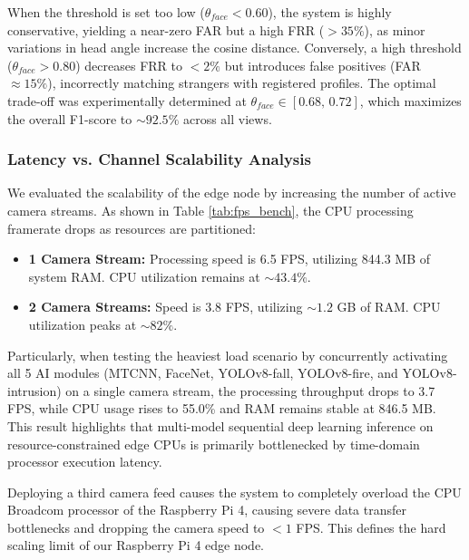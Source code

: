 \documentclass[12pt,a4paper]{article}
\begin{document}
When the threshold is set too low ($\theta_{face} < 0.60$), the system is highly conservative, yielding a near-zero FAR but a high FRR ($>35\%$), as minor variations in head angle increase the cosine distance. Conversely, a high threshold ($\theta_{face} > 0.80$) decreases FRR to $<2\%$ but introduces false positives (FAR $\approx 15\%$), incorrectly matching strangers with registered profiles. The optimal trade-off was experimentally determined at $\theta_{face} \in [0.68,\, 0.72]$, which maximizes the overall F1-score to $\sim 92.5\%$ across all views.

\subsubsection*{Latency vs. Channel Scalability Analysis}
We evaluated the scalability of the edge node by increasing the number of active camera streams. As shown in Table \ref{tab:fps_bench}, the CPU processing framerate drops as resources are partitioned:
\begin{itemize}
    \item \textbf{1 Camera Stream:} Processing speed is 6.5 FPS, utilizing 844.3 MB of system RAM. CPU utilization remains at $\sim 43.4\%$.
    \item \textbf{2 Camera Streams:} Speed is 3.8 FPS, utilizing $\sim 1.2$ GB of RAM. CPU utilization peaks at $\sim 82\%$.
\end{itemize}
Particularly, when testing the heaviest load scenario by concurrently activating all 5 AI modules (MTCNN, FaceNet, YOLOv8-fall, YOLOv8-fire, and YOLOv8-intrusion) on a single camera stream, the processing throughput drops to 3.7 FPS, while CPU usage rises to 55.0\% and RAM remains stable at 846.5 MB. This result highlights that multi-model sequential deep learning inference on resource-constrained edge CPUs is primarily bottlenecked by time-domain processor execution latency.

Deploying a third camera feed causes the system to completely overload the CPU Broadcom processor of the Raspberry Pi 4, causing severe data transfer bottlenecks and dropping the camera speed to $< 1$ FPS. This defines the hard scaling limit of our Raspberry Pi 4 edge node.
\end{document}
